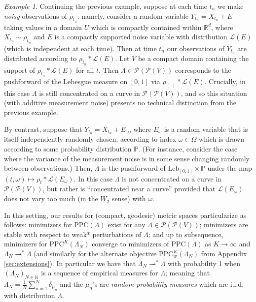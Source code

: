 \documentclass[aos, preprint]{imsart}
\theoremstyle{plain}
\theoremstyle{remark}
\newtheorem{example}{Example}[section]
\begin{document}
{\begin{example}
Continuing the previous example, suppose at each time $t_{n}$ we
make \emph{noisy} observations of $\rho_{t_{n}}$: namely, consider a random
variable $Y_{t_{n}}=X_{t_{n}}+E$ taking values in a domain $U$ which is compactly contained within $\mathbb{R}^d$, where $X_{t_{n}}\sim\rho_{t_{n}}$
and $E$ is a compactly supported noise variable with distribution $\mathcal{L}(E)$ (which
is independent at each time). Then at time $t_{n}$ our observations of $Y_{t_n}$
are distributed according to $\rho_{t_{n}}*\mathcal{L}(E)$. Let $V$ be a compact domain containing the support of $\rho_{t_{n}}*\mathcal{L}(E)$ for all $t$. Then  $\Lambda \in \mathcal{P}(\mathcal{P}(V))$ corresponds to the pushforward of the Lebesgue measure
on $[0,1]$ via $\rho_{(\cdot)}*\mathcal{L}(E)$. Crucially,
in this case $\Lambda$ is still concentrated on a curve in $\mathcal{P}(\mathcal{P}(V))$,
and so this situation (with additive measurement noise) presents no
technical distinction from the previous example.

By contrast, suppose that $Y_{t_{n}}=X_{t_{n}}+E_{\omega}$, where
$E_{\omega}$ is a random variable that is itself independently randomly
chosen, according to index $\omega\in\Omega$ which is drawn according
to some probability distribution $\mathbb{P}$. (For instance, consider
the case where the variance of the measurement noise is in some sense
changing randomly between observations.) Then, $\Lambda$ is the pushforward
of $\text{Leb}_{[0,1]}\times\mathbb{P}$ under the map $(t,\omega)\mapsto\rho_{t}*\mathcal{L}(E_{\omega})$.
In this case $\Lambda$ is not concentrated on a curve in $\mathcal{P}(\mathcal{P}(V))$,
but rather is ``concentrated near a curve'' provided that $\mathcal{L}(E_{\omega})$
does not vary too much (in the $W_{2}$ sense) with $\omega$.
\end{example}

In this setting, our results for (compact, geodesic) metric spaces particularize
as follows: minimizers for $\text{PPC}(\Lambda)$ exist for any $\Lambda \in\mathcal{P}(\mathcal{P}(V))$;
minimizers are stable with respect to weak{*} perturbations of $\Lambda$;
and up to subsequence, minimizers for $\text{PPC}^{K}(\Lambda_{N})$
converge to minimizers of $\text{PPC}(\Lambda)$ as $K\rightarrow\infty$ and
$\Lambda_{N}\rightharpoonup^{*}\Lambda$ (and similarly for the alternate objective $\text{PPC}_{w}^{K}(\Lambda_{N})$ from Appendix \ref{sec:extensions}). In particular we have that
$\Lambda_{N}\rightharpoonup^{*}\Lambda$ with probability 1 when $(\Lambda_{N})_{N\in\mathbb{N}}$
is a sequence of empirical measures for $\Lambda$; meaning that $\Lambda_{N}=\frac{1}{N}\sum_{n=1}^{N}\delta_{\mu_{n}}$
and the $\mu_{n}$'s are \emph{random probability measures} which
are i.i.d. with distribution $\Lambda$.

}
\end{document}
